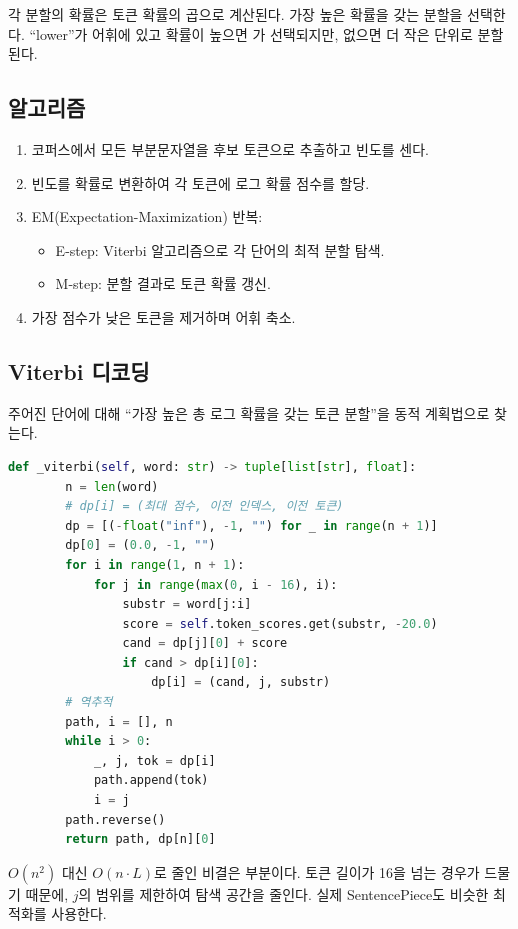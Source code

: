 각 분할의 확률은 토큰 확률의 곱으로 계산된다. 가장 높은 확률을 갖는 분할을 선택한다. ``lower''가 어휘에 있고 확률이 높으면 \code{[lower]}가 선택되지만, 없으면 더 작은 단위로 분할된다.

\subsection{알고리즘}

\begin{enumerate}
  \item 코퍼스에서 모든 부분문자열을 후보 토큰으로 추출하고 빈도를 센다.
  \item 빈도를 확률로 변환하여 각 토큰에 로그 확률 점수를 할당.
  \item EM(Expectation-Maximization) 반복:
    \begin{itemize}
      \item E-step: Viterbi 알고리즘으로 각 단어의 최적 분할 탐색.
      \item M-step: 분할 결과로 토큰 확률 갱신.
    \end{itemize}
  \item 가장 점수가 낮은 토큰을 제거하며 어휘 축소.
\end{enumerate}

\subsection{Viterbi 디코딩}

주어진 단어에 대해 ``가장 높은 총 로그 확률을 갖는 토큰 분할''을 동적 계획법으로 찾는다.

\begin{lstlisting}[language=Python]
    def _viterbi(self, word: str) -> tuple[list[str], float]:
        n = len(word)
        # dp[i] = (최대 점수, 이전 인덱스, 이전 토큰)
        dp = [(-float("inf"), -1, "") for _ in range(n + 1)]
        dp[0] = (0.0, -1, "")
        for i in range(1, n + 1):
            for j in range(max(0, i - 16), i):
                substr = word[j:i]
                score = self.token_scores.get(substr, -20.0)
                cand = dp[j][0] + score
                if cand > dp[i][0]:
                    dp[i] = (cand, j, substr)
        # 역추적
        path, i = [], n
        while i > 0:
            _, j, tok = dp[i]
            path.append(tok)
            i = j
        path.reverse()
        return path, dp[n][0]
\end{lstlisting}

\begin{infobox}
$O(n^2)$ 대신 $O(n \cdot L)$로 줄인 비결은  부분이다. 토큰 길이가 16을 넘는 경우가 드물기 때문에, $j$의 범위를 제한하여 탐색 공간을 줄인다. 실제 SentencePiece도 비슷한 최적화를 사용한다.
\end{infobox}

